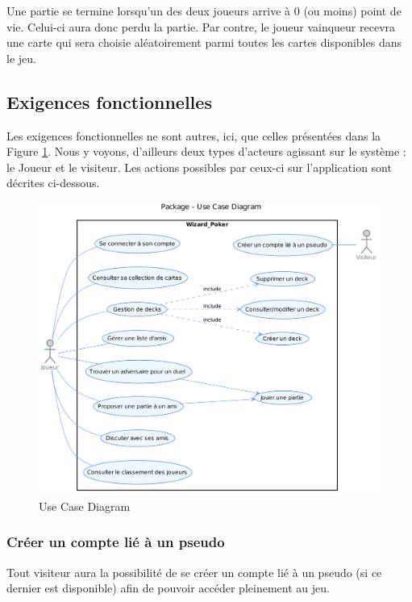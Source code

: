 \documentclass[11pt,a4paper]{article}
\begin{document}
\medbreak

Une partie se termine lorsqu'un des deux joueurs arrive à 0 (ou moins) point de vie.  Celui-ci aura donc perdu la partie.  Par contre, le joueur vainqueur recevra une carte qui sera choisie aléatoirement parmi toutes les cartes disponibles dans le jeu.


\subsection{Exigences fonctionnelles}

Les exigences fonctionnelles ne sont autres, ici, que celles présentées dans la Figure \ref{fig:usecasebesoin}. Nous y voyons, d'ailleurs deux types d'acteurs agissant sur le système : le Joueur et le \gls{visiteur}. Les actions possibles par ceux-ci sur l'application sont décrites ci-dessous.

\label{sec:exi-fonc}
\begin{figure}[ht]
  \centering
  \includegraphics[width=1\textwidth]{assets/uml/UseCaseDiagram.png}
  \caption{\label{fig:usecasebesoin} Use Case Diagram}
\end{figure}

\subsubsection*{Créer un compte lié à un pseudo}

Tout visiteur aura la possibilité de se créer un compte
lié à un \gls{pseudo} (si ce dernier est disponible) afin de pouvoir
accéder pleinement au jeu.
\end{document}
